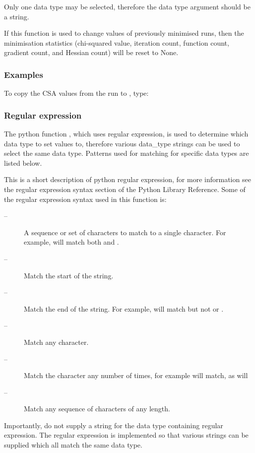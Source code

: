 Only one data type may be selected, therefore the data type argument should be a string.

If this function is used to change values of previously minimised  runs, then the
minimisation  statistics (chi-squared value, iteration count, function count, gradient count,
and Hessian count) will be reset to None.


\subsubsection{Examples}

To copy  the CSA values from the run 
 to 
, type:






\subsubsection{Regular expression}

The python  function 
, which uses regular expression,  is used to determine which data
type to set values to, therefore various data\_type strings can be used to select the same
data type.  Patterns used for matching for specific data types are listed below.

This is a short description of python  regular expression,  for more information see the
regular expression  syntax section of the Python  Library Reference.  Some of the regular
expression syntax used in this function is:

\begin{description}
\item[    
 --]   A sequence  or set of characters to match to a single character.  For example, 
 will match both 
 and 
. 
\item[    
 --]   Match the start of the string. 
\item[    
 --]   Match the end of the string.  For example, 
 will match 
 but not 
 or 
. 
\item[    
 --]   Match any character. 
\item[    
 --]   Match the character 
 any number of times, for example 
 will match, as will 
 
\item[    
 --]   Match any sequence  of characters of any length. 
\end{description}
Importantly, do not supply a string for the data type containing regular expression.   The
regular expression  is implemented so that various strings can be supplied which all match
the same data type.


